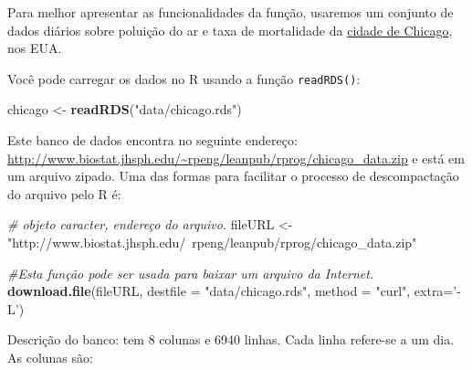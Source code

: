 \documentclass[]{book}
\newenvironment{Shaded}{\begin{snugshade}}{\end{snugshade}}
\newcommand{\CommentTok}[1]{\textcolor[rgb]{0.56,0.35,0.01}{\textit{#1}}}
\newcommand{\DataTypeTok}[1]{\textcolor[rgb]{0.13,0.29,0.53}{#1}}
\newcommand{\KeywordTok}[1]{\textcolor[rgb]{0.13,0.29,0.53}{\textbf{#1}}}
\newcommand{\NormalTok}[1]{#1}
\newcommand{\StringTok}[1]{\textcolor[rgb]{0.31,0.60,0.02}{#1}}
\begin{document}
Para melhor apresentar as funcionalidades da função, usaremos um conjunto de dados diários sobre poluição do ar e taxa de mortalidade da \href{http://www.biostat.jhsph.edu/~rpeng/leanpub/rprog/chicago_data.zip}{cidade de Chicago}, nos EUA.

Você pode carregar os dados no R usando a função \texttt{readRDS()}:

\begin{Shaded}
\begin{Highlighting}[]
\NormalTok{chicago <-}\StringTok{ }\KeywordTok{readRDS}\NormalTok{(}\StringTok{"data/chicago.rds"}\NormalTok{)}
\end{Highlighting}
\end{Shaded}

Este banco de dados encontra no seguinte endereço: \url{http://www.biostat.jhsph.edu/~rpeng/leanpub/rprog/chicago_data.zip} e está em um arquivo zipado. Uma das formas para facilitar o processo de descompactação do arquivo pelo R é:

\begin{Shaded}
\begin{Highlighting}[]
\CommentTok{# objeto caracter, endereço do arquivo.}
\NormalTok{fileURL <-}\StringTok{ "http://www.biostat.jhsph.edu/~rpeng/leanpub/rprog/chicago_data.zip"}

\CommentTok{#Esta função pode ser usada para baixar um arquivo da Internet.}
\KeywordTok{download.file}\NormalTok{(fileURL, }\DataTypeTok{destfile =} \StringTok{"data/chicago.rds"}\NormalTok{, }\DataTypeTok{method =} \StringTok{"curl"}\NormalTok{, }\DataTypeTok{extra=}\StringTok{'-L'}\NormalTok{) }
\end{Highlighting}
\end{Shaded}

Descrição do banco: tem 8 colunas e 6940 linhas. Cada linha refere-se a um dia. As colunas são:
\end{document}
